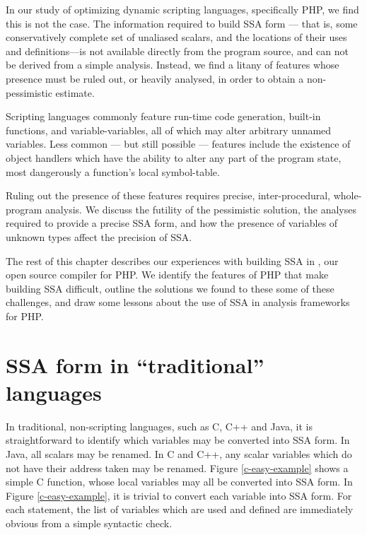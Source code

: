 In our study of optimizing dynamic scripting languages, specifically
PHP, we find this is not the case.  The information required to build
SSA form --- that is, some conservatively complete set of unaliased
scalars, and the locations of their uses and definitions---is not
available directly from the program source, and can not be derived
from a simple analysis.  Instead, we find a litany of features whose
presence must be ruled out, or heavily analysed, in order to obtain a
non-pessimistic estimate.

Scripting languages commonly feature run-time code generation,
built-in functions, and variable-variables, all of which may alter
arbitrary unnamed variables.  Less common --- but still
possible --- features include the existence of object handlers which
have the ability to alter any part of the program state, most
dangerously a function's local symbol-table.

Ruling out the presence of these features requires precise,
inter-procedural, whole-program analysis.  We discuss the futility of
the pessimistic solution, the analyses required to provide a precise
SSA form, and how the presence of variables of unknown types affect
the precision of SSA.


The rest of this chapter describes our experiences with building SSA
in \phc, our open source compiler for PHP.  We identify the features
of PHP that make building SSA difficult, outline the solutions we
found to these some of these challenges, and draw some lessons about
the use of SSA in analysis frameworks for PHP.



\section{SSA form in ``traditional'' languages}

In traditional, non-scripting languages, such as C, C++ and Java, it
is straightforward to identify which variables may be converted into
SSA form.  In Java, all scalars may be renamed.  In C and C++, any
scalar variables which do not have their address taken may be renamed.
Figure \ref{c-easy-example} shows a simple C function, whose local
variables may all be converted into SSA form.  In Figure
\ref{c-easy-example}, it is trivial to convert each variable into SSA form.
For each statement, the list of variables which are used and defined
are immediately obvious from a simple syntactic check.

